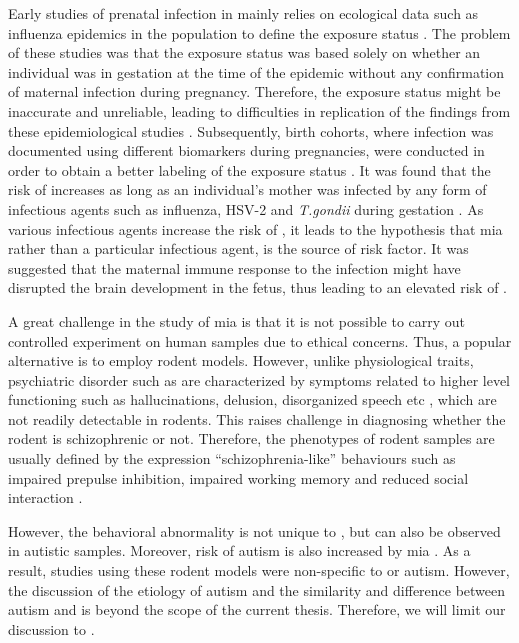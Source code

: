 	Early studies of prenatal infection in  mainly relies on ecological data such as influenza epidemics in the population to define the exposure status \citep{Brown2010}.
	The problem of these studies was that the exposure status was based solely on whether an individual was in gestation at the time of the epidemic without any confirmation of maternal infection during pregnancy.
	Therefore, the exposure status might be inaccurate and unreliable, leading to difficulties in replication of the findings from these epidemiological studies \citep{Brown2010}.  
	Subsequently, birth cohorts, where infection was documented using different biomarkers during pregnancies, were conducted in order to obtain a better labeling of the exposure status \citep{Brown2010}.
	It was found that the risk of  increases as long as an individual's mother was infected by any form of infectious agents such as influenza, HSV-2 and \textit{T.gondii} during gestation \citep{Brown2010}.
	As various infectious agents increase the risk of , it leads to the hypothesis that \gls{mia} \citep{Brown2010} rather than a particular infectious agent, is the source of risk factor. 
	It was suggested that the maternal immune response to the infection might have disrupted the brain development in the fetus, thus leading to an elevated risk of  \citep{Garbett2012a}.
	
	A great challenge in the study of \gls{mia} is that it is not possible to carry out controlled experiment on human samples due to ethical concerns.
	Thus, a popular alternative is to employ rodent models.
	However, unlike physiological traits, psychiatric disorder such as  are characterized by symptoms related to higher level functioning such as hallucinations, delusion, disorganized speech etc \citep{AmericanPsychiatricAssociation2013}, which are not readily detectable in rodents.
	This raises challenge in diagnosing whether the rodent is schizophrenic or not.
	Therefore, the phenotypes of rodent samples are usually defined by the expression ``schizophrenia-like'' behaviours such as impaired prepulse inhibition, impaired working memory and reduced social interaction \citep{Meyer2007a}.
	
	However, the behavioral abnormality is not unique to , but can also be observed in autistic samples.
	Moreover, risk of autism is also increased by \gls{mia} \citep{Brown2012}.
	As a result, studies using these rodent models were non-specific to  or autism. 
	However, the discussion of the etiology of autism and the similarity and difference between autism and  is beyond the scope of the current thesis.
	Therefore, we will limit our discussion to .
	
